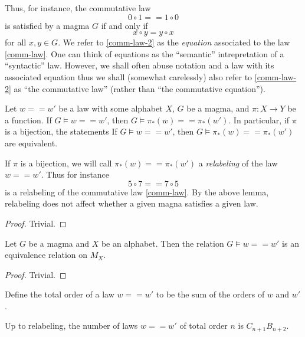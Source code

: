 Thus, for instance, the commutative law
\begin{equation}\label{comm-law}
  0 \circ 1 == 1 \circ 0
\end{equation}
is satisfied by a magma $G$ if and only if
\begin{equation}\label{comm-law-2}
 x \circ y = y \circ x
\end{equation}
for all $x, y \in G$.  We refer to \eqref{comm-law-2} as the \emph{equation} associated to the law \eqref{comm-law}.  One can think of equations as the ``semantic'' intrepretation of a ``syntactic'' law.  However, we shall often abuse notation and a law with its associated equation thus we shall (somewhat carelessly) also refer to \eqref{comm-law-2} as ``the commutative law'' (rather than ``the commutative equation'').

\begin{lemma}[Pushforward]\label{push}  Let $w == w'$ be a law with some alphabet $X$, $G$ be a magma, and $\pi: X \to Y$ be a function.  If $G \models w == w'$, then $G \models \pi_*(w) == \pi_*(w')$.  In particular, if $\pi$ is a bijection, the statements If $G \models w == w'$, then $G \models \pi_*(w) == \pi_*(w')$ are equivalent.
\end{lemma}

If $\pi$ is a bijection, we will call $\pi_*(w) == \pi_*(w')$ a \emph{relabeling} of the law $w == w'$.  Thus for instance
$$ 5 \circ 7 == 7 \circ 5$$
is a relabeling of the commutative law \eqref{comm-law}.  By the above lemma, relabeling does not affect whether a given magna satisfies a given law.

\begin{proof}  Trivial.
\end{proof}

\begin{lemma}[Equivalence]\label{equiv}  Let $G$ be a magma and $X$ be an alphabet.  Then the relation $G \models w == w'$ is an equivalence relation on $M_X$.
\end{lemma}

\begin{proof}  Trivial.
\end{proof}

Define the total order of a law $w == w'$ to be the sum of the orders of $w$ and $w'$.

\begin{lemma}\label{law-count}  Up to relabeling, the number of laws $w == w'$ of total order $n$ is $C_{n+1} B_{n+2}$.
\end{lemma}

